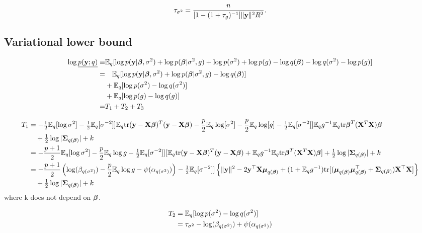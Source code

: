 \documentclass{amsart}[12pt]
\begin{document}
\begin{align*}
\tau_{\sigma^2} = \frac{n}{[1 - (1 + \tau_g)^{-1}]\|{\bf y}\|^2 R^2}.
\end{align*}

\subsection{Variational lower bound}

\begin{align*}
\log \underline{p({\bf y}; q)} \equiv& \mathbb{E}_q [\log p({\bf y} | {\boldsymbol \beta}, \sigma^2) + \log p({\boldsymbol \beta} | \sigma^2, g)
																					+ \log p(\sigma^2) + \log p(g) - \log q({\boldsymbol \beta})
																					- \log q(\sigma^2) - \log p(g)] \\
=& \quad \mathbb{E}_q [\log p({\bf y}| {\boldsymbol \beta}, \sigma^2) + \log p({\boldsymbol \beta} | \sigma^2, g) - \log q({\boldsymbol \beta})] \\
	&+ \mathbb{E}_q [\log p(\sigma^2) - \log q(\sigma^2)] \\
	&+ \mathbb{E}_q [\log p(g) - \log q(g)] \\
=& T_1 + T_2 + T_3
\end{align*}

\begin{align*}
T_1 &= -\tfrac{1}{2} \mathbb{E}_q [\log \sigma^2] -\tfrac{1}{2} \mathbb{E}_q [\sigma^{-2}]] \mathbb{E}_q \text{tr} ({\bf y} - {\bf X} {\boldsymbol \beta})^T ({\bf y} - {\bf X} {\boldsymbol \beta})
- \frac{p}{2} \mathbb{E}_q \log [\sigma^2] - \frac{p}{2} \mathbb{E}_q \log [g] - \tfrac{1}{2} \mathbb{E}_q [\sigma^{-2}]] \mathbb{E}_q g^{-1} \mathbb{E}_q \text{tr} {\boldsymbol\beta}^T ({\bf X}^T {\bf X}) {\boldsymbol \beta} \\
& \quad + \tfrac{1}{2} \log |{\boldsymbol \Sigma}_{q({\boldsymbol \beta})}| + k \\
&= -\frac{p + 1}{2} \mathbb{E}_q [\log \sigma^2] - \frac{p}{2} \mathbb{E}_q \log g
-\tfrac{1}{2} \mathbb{E}_q [\sigma^{-2}]] [\mathbb{E}_q \text{tr} ({\bf y} - {\bf X} {\boldsymbol \beta})^T ({\bf y} - {\bf X} {\boldsymbol \beta}) + \mathbb{E}_q g^{-1} \mathbb{E}_q \text{tr} {\boldsymbol\beta}^T ({\bf X}^T {\bf X}) {\boldsymbol \beta}]
+ \tfrac{1}{2} \log |{\boldsymbol \Sigma}_{q({\boldsymbol \beta})}| + k \\
&= -\frac{p + 1}{2} \left (\log (\beta_{q(\sigma^2)}) - \frac{p}{2} \mathbb{E}_q \log g - \psi(\alpha_{q(\sigma^2)}) \right )
- \tfrac{1}{2} \mathbb{E}_q [\sigma^{-2}]] \left \{ \| {\bf y}\|^2 - 2 {\bf y}^\top {\bf X} {\boldsymbol\mu}_{q({\boldsymbol \beta})} + (1 + \mathbb{E}_q g^{-1}) \text{tr}[({\boldsymbol \mu}_{q({\boldsymbol \beta})} {\boldsymbol \mu}_{q({\boldsymbol \beta})}^\top + {\boldsymbol \Sigma}_{q({\boldsymbol \beta})}) {\bf X}^\top {\bf X}] \right \}  \\
& \quad + \tfrac{1}{2} \log |{\boldsymbol \Sigma}_{q({\boldsymbol \beta})}| + k
\end{align*}
where k does not depend on ${\boldsymbol \beta}$.

\begin{align*}
T_2 &= \mathbb{E}_q [\log p(\sigma^2) - \log q(\sigma^2)] \\
&= \tau_{\sigma^2} - \log(\beta_{q(\sigma^2)}) + \psi(\alpha_{q(\sigma^2)})
\end{align*}
\end{document}
